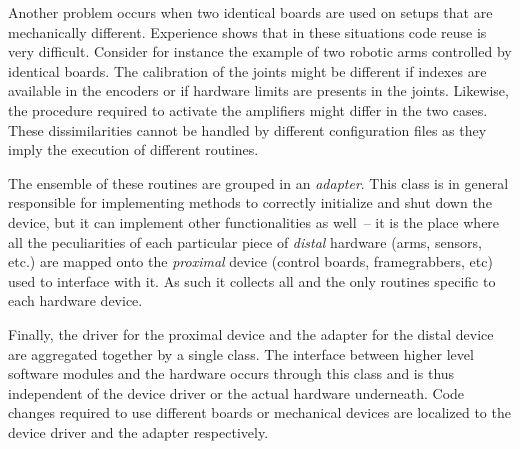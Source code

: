 
Another problem occurs when two identical boards are used
on setups that are mechanically different. Experience shows that in
these situations code reuse is very difficult. Consider for instance
the example of two robotic arms controlled by identical boards. The
calibration of the joints might be different if indexes are available
in the encoders or if hardware limits are presents in the
joints. Likewise, the procedure required to activate the amplifiers
might differ in the two cases. These dissimilarities cannot be handled
by different configuration files as they imply the execution of
different routines.

The ensemble of these routines are grouped in an {\em adapter}. This class
is in general responsible for implementing methods to correctly
initialize and shut down the device, but it can implement other
functionalities as well~-- it is the place where all the
peculiarities of each particular piece of {\em distal} hardware 
(arms, sensors, etc.)
%
%
are mapped onto the {\em proximal} device (control boards, framegrabbers, etc) used
to interface with it.  As such it collects all and the only
routines specific to each hardware device.

Finally, the driver for the proximal device and
the adapter for the distal device are aggregated together by a single
class. The interface between higher level software modules and the
hardware occurs through this class and is thus independent of the
device driver or the actual hardware underneath. Code changes required
to use different boards or mechanical devices are localized to the
device driver and the adapter respectively.

